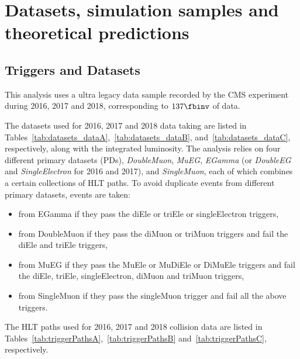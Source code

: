 
\section{Datasets, simulation samples and theoretical predictions}


\subsection{Triggers and Datasets}
\label{sec:trigpaths}


This analysis uses a ultra legacy data sample recorded by the CMS experiment during 2016, 2017 and 2018, corresponding to $\usedLumiABC$ of data.  

The datasets used for 2016, 2017 and 2018 data taking are listed in Tables~\ref{tab:datasets_dataA},~\ref{tab:datasets_dataB}, and~\ref{tab:datasets_dataC}, respectively, along with the integrated luminosity. 
The analysis relies on four different primary datasets (PDs), {\it DoubleMuon}, {\it MuEG}, {\it EGamma} (or {\it DoubleEG} and {\it SingleElectron} for 2016 and 2017), and {\it SingleMuon},
each of which combines a certain collections of HLT paths. 
To avoid duplicate events from different primary datasets, events are taken: 
\begin{itemize}
\item from EGamma if they pass the diEle or triEle or singleElectron triggers,
\item from DoubleMuon if they pass the diMuon or triMuon triggers and fail the diEle and triEle triggers,
\item from MuEG if they pass the MuEle or MuDiEle or DiMuEle triggers and fail the diEle, triEle, singleElectron, diMuon and triMuon triggers,
\item from SingleMuon if they pass the singleMuon trigger and fail all the above triggers. 
\end{itemize} 

The HLT paths used for 2016, 2017 and 2018 collision data are listed in Tables~\ref{tab:triggerPathsA},~\ref{tab:triggerPathsB} and~\ref{tab:triggerPathsC}, respectively.

